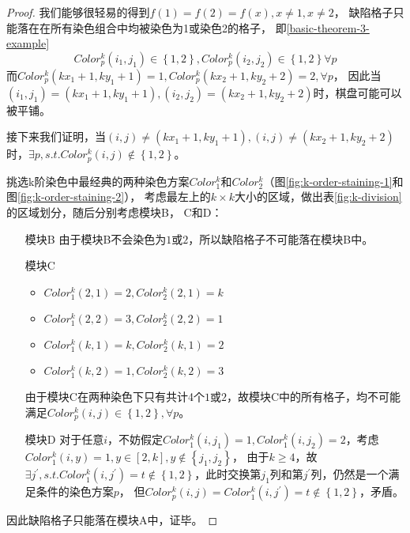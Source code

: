 \begin{proof}
	我们能够很轻易的得到$f(1) = f(2) = f(x), x \neq 1, x \neq 2$，
	缺陷格子只能落在在所有染色组合中均被染色为1或染色2的格子，
	即\ref{basic-theorem-3-example}
	\begin{equation}
		Color^k_p(i_1, j_1) \in \left\{1, 2\right\}, Color^k_p(i_2, j_2) \in \left\{1, 2\right\} \forall p
		\label{basic-theorem-3-example}
	\end{equation}
	而$Color^k_p(kx_1 + 1, ky_1 + 1) = 1, Color^k_p(kx_2 + 1, ky_2 + 2) = 2, \forall p$，
	因此当$(i_1, j_1) = (kx_1 + 1, ky_1 + 1), (i_2, j_2) = (kx_2 + 1, ky_2 + 2)$时，棋盘可能可以被平铺。

	接下来我们证明，当$(i, j) \neq (kx_1 + 1, ky_1 + 1), (i, j) \neq (kx_2 + 1, ky_2 + 2)$时，$\exists p, s.t. Color^k_p(i, j) \notin \left\{1, 2\right\}$。

	挑选k阶染色中最经典的两种染色方案$Color^k_1$和$Color^k_2$（图\ref{fig:k-order-staining-1}和图\ref{fig:k-order-staining-2}），
	考虑最左上的$k \times k$大小的区域，做出表\ref{fig:k-division}的区域划分，随后分别考虑模块B， C和D：

	\begin{itemize}
		\item[模块B] 由于模块B不会染色为$1$或$2$，所以缺陷格子不可能落在模块B中。
		\item[模块C]
			\begin{itemize}
				\item $Color^k_1(2, 1) = 2, Color^k_2(2, 1) = k$
				\item $Color^k_1(2, 2) = 3, Color^k_2(2, 2) = 1$
				\item $Color^k_1(k, 1) = k, Color^k_2(k, 1) = 2$
				\item $Color^k_1(k, 2) = 1, Color^k_2(k, 2) = 3$
			\end{itemize}
			由于模块C在两种染色下只有共计4个$1$或$2$，故模块C中的所有格子，均不可能满足$Color^k_p(i, j) \in \left\{1, 2\right\}, \forall p$。
		\item[模块D] 对于任意$i$，不妨假定$Color^k_1(i, j_1) = 1, Color^k_1(i, j_2) = 2$，考虑$Color^k_1(i, y) = 1, y \in [2, k], y \notin \left\{j_1, j_2\right\}$，
			由于$k \ge 4$，故$\exists j^{'}, s.t. Color^k_1(i, j^{'}) = t \notin \left\{1, 2\right\}$，此时交换第$j_1$列和第$j^{'}$列，仍然是一个满足条件的染色方案$p$，
			但$Color^k_p(i, j) = Color^k_1(i, j^{'}) = t \notin \left\{1, 2\right\}$，矛盾。
	\end{itemize}
	因此缺陷格子只能落在模块A中，证毕。
\end{proof}

